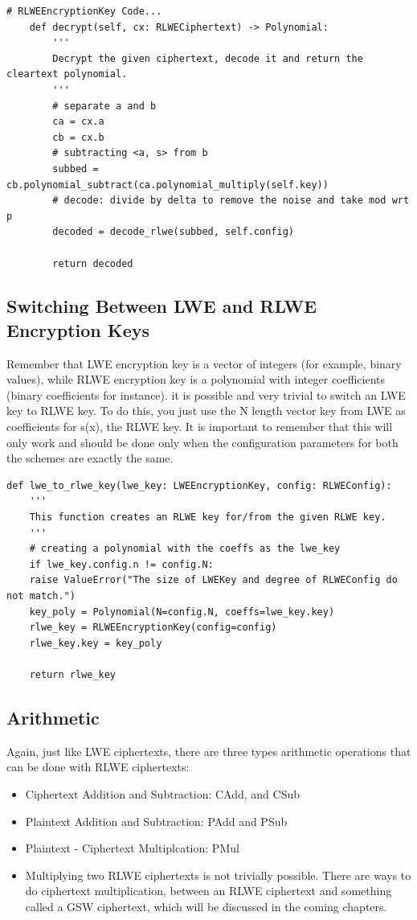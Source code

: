 \documentclass{report}
\begin{document}
\begin{verbatim}
# RLWEEncryptionKey Code...
	def decrypt(self, cx: RLWECiphertext) -> Polynomial:
		'''
		Decrypt the given ciphertext, decode it and return the cleartext polynomial.
		'''
		# separate a and b
		ca = cx.a
		cb = cx.b
		# subtracting <a, s> from b
		subbed = cb.polynomial_subtract(ca.polynomial_multiply(self.key))
		# decode: divide by delta to remove the noise and take mod wrt p
		decoded = decode_rlwe(subbed, self.config)
		
		return decoded
\end{verbatim}
			
		\subsection{Switching Between LWE and RLWE Encryption Keys}
		Remember that LWE encryption key is a vector of integers (for example, binary values), while RLWE encryption key is a polynomial with integer coefficients (binary coefficients for instance). it is possible and very trivial to switch an LWE key to RLWE key. To do this, you just use the N length vector key from LWE as coefficients for s(x), the RLWE key. It is important to remember that this will only work and should be done only when the configuration parameters for both the schemes are exactly the same.
\begin{verbatim}
def lwe_to_rlwe_key(lwe_key: LWEEncryptionKey, config: RLWEConfig):
	'''
	This function creates an RLWE key for/from the given RLWE key.
	'''
	# creating a polynomial with the coeffs as the lwe_key
	if lwe_key.config.n != config.N:
	raise ValueError("The size of LWEKey and degree of RLWEConfig do not match.")
	key_poly = Polynomial(N=config.N, coeffs=lwe_key.key)
	rlwe_key = RLWEEncryptionKey(config=config)
	rlwe_key.key = key_poly
	
	return rlwe_key
\end{verbatim}
		
		\subsection{Arithmetic}
		Again, just like LWE ciphertexts, there are three types arithmetic operations that can be done with RLWE ciphertexts:
		\begin{itemize}
			\item Ciphertext Addition and Subtraction: CAdd, and CSub
			\item Plaintext Addition and Subtraction: PAdd and PSub
			\item Plaintext - Ciphertext Multiplcation: PMul
			\item Multiplying two RLWE ciphertexts is not trivially possible. There are ways to do ciphertext multiplication, between an RLWE ciphertext and something called a GSW ciphertext, which will be discussed in the coming chapters.
		\end{itemize}
		
\end{document}
